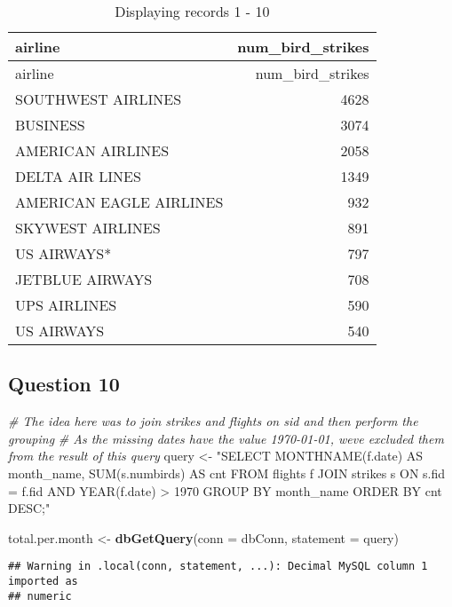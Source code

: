 \documentclass[
]{article}
\newenvironment{Shaded}{\begin{snugshade}}{\end{snugshade}}
\newcommand{\AttributeTok}[1]{\textcolor[rgb]{0.13,0.29,0.53}{#1}}
\newcommand{\CommentTok}[1]{\textcolor[rgb]{0.56,0.35,0.01}{\textit{#1}}}
\newcommand{\FunctionTok}[1]{\textcolor[rgb]{0.13,0.29,0.53}{\textbf{#1}}}
\newcommand{\NormalTok}[1]{#1}
\newcommand{\OtherTok}[1]{\textcolor[rgb]{0.56,0.35,0.01}{#1}}
\newcommand{\StringTok}[1]{\textcolor[rgb]{0.31,0.60,0.02}{#1}}
\begin{document}
\begin{longtable}[]{@{}lr@{}}
\caption{Displaying records 1 - 10}\tabularnewline
\toprule\noalign{}
airline & num\_bird\_strikes \\
\midrule\noalign{}
\endfirsthead
\toprule\noalign{}
airline & num\_bird\_strikes \\
\midrule\noalign{}
\endhead
\bottomrule\noalign{}
\endlastfoot
SOUTHWEST AIRLINES & 4628 \\
BUSINESS & 3074 \\
AMERICAN AIRLINES & 2058 \\
DELTA AIR LINES & 1349 \\
AMERICAN EAGLE AIRLINES & 932 \\
SKYWEST AIRLINES & 891 \\
US AIRWAYS* & 797 \\
JETBLUE AIRWAYS & 708 \\
UPS AIRLINES & 590 \\
US AIRWAYS & 540 \\
\end{longtable}

\hypertarget{question-10}{%
\subsection{Question 10}\label{question-10}}

\begin{Shaded}
\begin{Highlighting}[]
\CommentTok{\# The idea here was to join strikes and flights on sid and then perform the grouping}
\CommentTok{\# As the missing dates have the value 1970{-}01{-}01, we\textquotesingle{}ve excluded them from the result of this query}
\NormalTok{query }\OtherTok{\textless{}{-}} \StringTok{"SELECT MONTHNAME(f.date) AS month\_name, SUM(s.numbirds) AS cnt}
\StringTok{FROM flights f}
\StringTok{JOIN strikes s ON s.fid = f.fid AND YEAR(f.date) \textgreater{} 1970}
\StringTok{GROUP BY month\_name}
\StringTok{ORDER BY cnt DESC;"}

\NormalTok{total.per.month }\OtherTok{\textless{}{-}} \FunctionTok{dbGetQuery}\NormalTok{(}\AttributeTok{conn =}\NormalTok{ dbConn, }\AttributeTok{statement =}\NormalTok{ query)}
\end{Highlighting}
\end{Shaded}

\begin{verbatim}
## Warning in .local(conn, statement, ...): Decimal MySQL column 1 imported as
## numeric
\end{verbatim}
\end{document}
